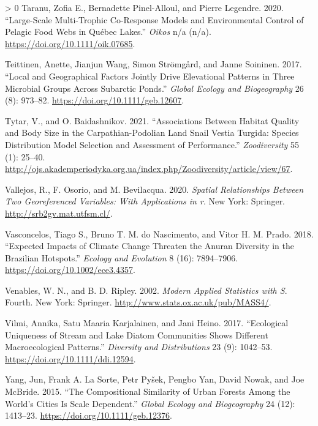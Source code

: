 \documentclass[10pt,oneside]{article}
\newlength{\cslhangindent}
\newenvironment{CSLReferences}[3] %
 {%
  \setlength{\parindent}{0pt}
  \ifodd #1 \everypar{\setlength{\hangindent}{\cslhangindent}}\ignorespaces\fi
  \ifnum #2 > 0
  \setlength{\parskip}{#2\baselineskip}
  \fi
 }%
 {}
\begin{document}
\begin{CSLReferences}{1}{0}
\leavevmode\hypertarget{ref-Taranu2020LarMul}{}%
Taranu, Zofia E., Bernadette Pinel-Alloul, and Pierre Legendre. 2020.
{``Large-Scale Multi-Trophic Co-Response Models and Environmental
Control of Pelagic Food Webs in Québec Lakes.''} \emph{Oikos} n/a (n/a).
\url{https://doi.org/10.1111/oik.07685}.

\leavevmode\hypertarget{ref-Teittinen2017LocGeo}{}%
Teittinen, Anette, Jianjun Wang, Simon Strömgård, and Janne Soininen.
2017. {``Local and Geographical Factors Jointly Drive Elevational
Patterns in Three Microbial Groups Across Subarctic Ponds.''}
\emph{Global Ecology and Biogeography} 26 (8): 973--82.
\url{https://doi.org/10.1111/geb.12607}.

\leavevmode\hypertarget{ref-Tytar2021AssHab}{}%
Tytar, V., and O. Baidashnikov. 2021. {``Associations Between Habitat
Quality and Body Size in the Carpathian-Podolian Land Snail Vestia
Turgida: Species Distribution Model Selection and Assessment of
Performance.''} \emph{Zoodiversity} 55 (1): 25--40.
\url{http://ojs.akademperiodyka.org.ua/index.php/Zoodiversity/article/view/67}.

\leavevmode\hypertarget{ref-Vallejos2020SpaRel}{}%
Vallejos, R., F. Osorio, and M. Bevilacqua. 2020. \emph{Spatial
Relationships Between Two Georeferenced Variables: With Applications in
r}. New York: Springer. \url{http://srb2gv.mat.utfsm.cl/}.

\leavevmode\hypertarget{ref-Vasconcelos2018ExpImp}{}%
Vasconcelos, Tiago S., Bruno T. M. do Nascimento, and Vitor H. M. Prado.
2018. {``Expected Impacts of Climate Change Threaten the Anuran
Diversity in the Brazilian Hotspots.''} \emph{Ecology and Evolution} 8
(16): 7894--7906. \url{https://doi.org/10.1002/ece3.4357}.

\leavevmode\hypertarget{ref-Venables2002ModApp}{}%
Venables, W. N., and B. D. Ripley. 2002. \emph{Modern Applied Statistics
with S}. Fourth. New York: Springer.
\url{http://www.stats.ox.ac.uk/pub/MASS4/}.

\leavevmode\hypertarget{ref-Vilmi2017EcoUni}{}%
Vilmi, Annika, Satu Maaria Karjalainen, and Jani Heino. 2017.
{``Ecological Uniqueness of Stream and Lake Diatom Communities Shows
Different Macroecological Patterns.''} \emph{Diversity and
Distributions} 23 (9): 1042--53.
\url{https://doi.org/10.1111/ddi.12594}.

\leavevmode\hypertarget{ref-Yang2015ComSim}{}%
Yang, Jun, Frank A. La Sorte, Petr Pyšek, Pengbo Yan, David Nowak, and
Joe McBride. 2015. {``The Compositional Similarity of Urban Forests
Among the World's Cities Is Scale Dependent.''} \emph{Global Ecology and
Biogeography} 24 (12): 1413--23.
\url{https://doi.org/10.1111/geb.12376}.


\end{CSLReferences}
\end{document}
